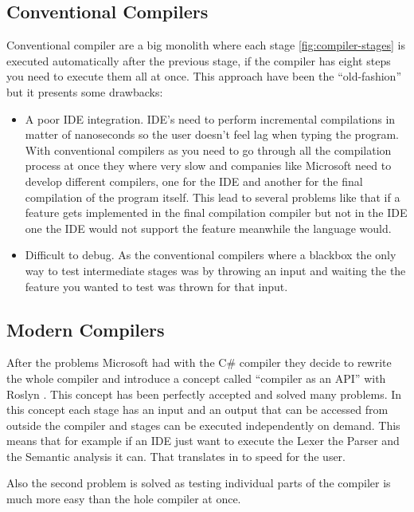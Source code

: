 \subsection{Conventional Compilers}
Conventional compiler are a big monolith where each stage \ref{fig:compiler-stages} is executed automatically after the
previous stage, if the compiler has eight steps you need to execute them all at once. This approach have been the “old-fashion”
but it presents some drawbacks:
\begin{itemize}
    \item A poor IDE \cite{ide} integration. IDE’s need to perform incremental compilations in matter of nanoseconds so
    the user doesn’t feel lag when typing the program. With conventional compilers as you need to go through all the compilation
    process at once they where very slow and companies like Microsoft need to develop different compilers, one for the IDE and
    another for the final compilation of the program itself. This lead to several problems like that if a feature gets
    implemented in the final compilation compiler but not in the IDE one the IDE would not support the feature meanwhile
    the language would.
    \item Difficult to debug. As the conventional compilers where a blackbox the only way to test intermediate stages was
    by throwing an input and waiting the the feature you wanted to test was thrown for that input.
\end{itemize}

\subsection{Modern Compilers}
After the problems Microsoft had with the C\# compiler they decide to rewrite the whole compiler and introduce a concept
called “compiler as an API” with Roslyn \cite{dotNet}. This concept has been perfectly accepted and solved many problems.
In this concept each stage has an input and an output that can be accessed from outside the compiler and stages can be
executed independently on demand. This means that for example if an IDE just want to execute the Lexer the Parser and
the Semantic analysis it can. That translates in to speed for the user.

Also the second problem is solved as testing individual parts of the compiler is much more easy than the hole compiler
at once.
